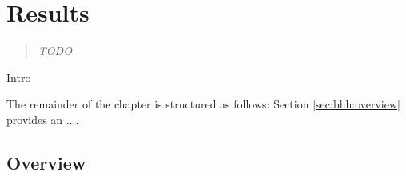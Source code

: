 \chapter{Results}
\label{chap:results}


\begin{quote}
    \textit{
    TODO
    }
\end{quote}

Intro

The remainder of the chapter is structured as follows: Section \ref{sec:bhh:overview} provides an ....




\section{Overview}
\label{sec:results:overview}





